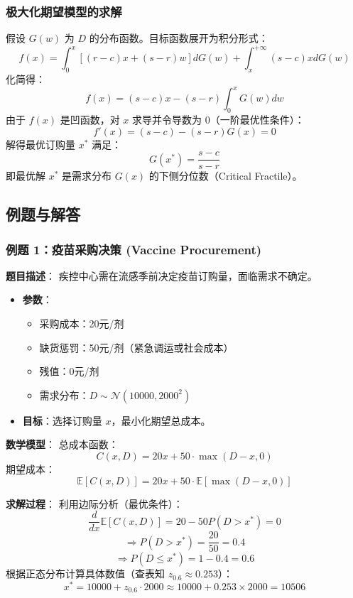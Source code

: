 \documentclass[a4paper,12pt]{ctexart} %
\begin{document}
	\subsubsection{ 极大化期望模型的求解}
	假设 $G(w)$ 为 $D$ 的分布函数。目标函数展开为积分形式：
	\begin{equation}
		f(x) = \int_{0}^{x}[(r-c)x+(s-r)w]dG(w) + \int_{x}^{+\infty}(s-c)x dG(w)
	\end{equation}
	化简得：
	\begin{equation}
		f(x) = (s-c)x - (s-r)\int_{0}^{x}G(w)dw
	\end{equation}
	由于 $f(x)$ 是凹函数，对 $x$ 求导并令导数为 0（一阶最优性条件）：
	\[
	f'(x) = (s-c) - (s-r)G(x) = 0
	\]
	解得最优订购量 $x^*$ 满足：
	\begin{equation}
		G(x^*) = \frac{s-c}{s-r}
	\end{equation}
	即最优解 $x^*$ 是需求分布 $G(x)$ 的下侧分位数（Critical Fractile）。
	
	\subsection{ 例题与解答}
	
	\subsubsection{例题 1：疫苗采购决策 (Vaccine Procurement)}
	
	\textbf{题目描述}：
	疾控中心需在流感季前决定疫苗订购量，面临需求不确定。
	\begin{itemize}
		\item \textbf{参数}：
		\begin{itemize}
			\item 采购成本：20元/剂
			\item 缺货惩罚：50元/剂（紧急调运或社会成本）
			\item 残值：0元/剂
			\item 需求分布：$D \sim \mathcal{N}(10000, 2000^2)$
		\end{itemize}
		\item \textbf{目标}：选择订购量 $x$，最小化期望总成本。
	\end{itemize}
	
	\textbf{数学模型}：
	总成本函数：
	\[
	C(x,D) = 20x + 50 \cdot \max(D-x, 0)
	\]
	期望成本：
	\[
	\mathbb{E}[C(x,D)] = 20x + 50 \cdot \mathbb{E}[\max(D-x, 0)]
	\]
	
	\textbf{求解过程}：
	利用边际分析（最优条件）：
	\[
	\frac{d}{dx}\mathbb{E}[C(x,D)] = 20 - 50 P(D > x^*) = 0
	\]
	\[
	\Rightarrow P(D > x^*) = \frac{20}{50} = 0.4
	\]
	\[
	\Rightarrow P(D \le x^*) = 1 - 0.4 = 0.6
	\]
	根据正态分布计算具体数值（查表知 $z_{0.6} \approx 0.253$）：
	\[
	x^* = 10000 + z_{0.6} \cdot 2000 \approx 10000 + 0.253 \times 2000 = 10506
	\]
	
\end{document}

